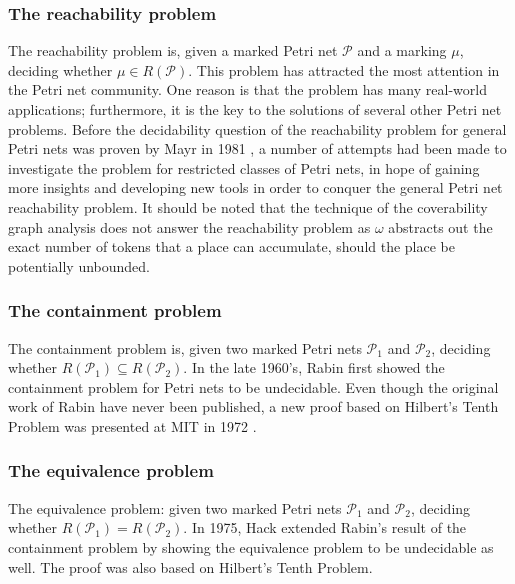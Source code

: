 \subsubsection{The reachability problem} %
\label{ssub:the_reachability_problem}
  The reachability problem is, given a marked Petri net $\mathcal P$ and a marking $\mu$, deciding whether $\mu\in R(\mathcal P)$. This problem has attracted the most attention in the Petri net community. One reason is that the problem has many real-world applications; furthermore, it is the key to the solutions of several other Petri net problems. Before the decidability question of the reachability problem for general Petri nets was proven by Mayr in 1981 \cite{Mayr81PetriNetReachability}, a number of attempts had been made to investigate the problem for restricted classes of Petri nets, in hope of gaining more insights and developing new tools in order to conquer the general Petri net reachability problem. It should be noted that the technique of the coverability graph analysis does not answer the reachability problem as $\omega$ abstracts out the exact number of tokens that a place can accumulate, should the place be potentially unbounded.

\subsubsection{The containment problem} %
\label{ssub:the_containment_problem}
  The containment problem is, given two marked Petri nets $\mathcal P_1$ and $\mathcal P_2$, deciding whether $R(\mathcal P_1)\subseteq R(\mathcal P_2)$. In the late 1960's, Rabin first showed the containment problem for Petri nets to be undecidable. Even though the original work of Rabin have never been published, a new proof based on Hilbert's Tenth Problem \cite{Davis73Hilbert} was presented at MIT in 1972 \cite{Baker73PetriNetContainment}.

\subsubsection{The equivalence problem} %
\label{ssub:the_equivalence_problem}
  The equivalence problem: given two marked Petri nets $\mathcal P_1$ and $\mathcal P_2$, deciding whether $R(\mathcal P_1) = R(\mathcal P_2)$. In 1975, Hack \cite{Hack1976PetriNetEquivalence} extended Rabin's result of the containment problem by showing the equivalence problem to be undecidable as well. The proof was also based on Hilbert's Tenth Problem.

